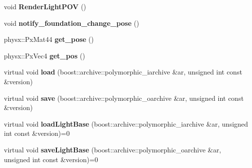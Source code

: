 \begin{DoxyCompactItemize}
\item 
\hypertarget{classNeb_1_1Light_1_1Base_aac6c4177c6fd3b4f8773b0d431203ccc}{void {\bfseries \-Render\-Light\-P\-O\-V} ()}\label{classNeb_1_1Light_1_1Base_aac6c4177c6fd3b4f8773b0d431203ccc}

\item 
\hypertarget{classNeb_1_1Light_1_1Base_a45e032e7aa7203c0832d52949e14141c}{void {\bfseries notify\-\_\-foundation\-\_\-change\-\_\-pose} ()}\label{classNeb_1_1Light_1_1Base_a45e032e7aa7203c0832d52949e14141c}

\item 
\hypertarget{classNeb_1_1Light_1_1Base_a78c4664de9ddf719dea72d00fa8498a4}{physx\-::\-Px\-Mat44 {\bfseries get\-\_\-pose} ()}\label{classNeb_1_1Light_1_1Base_a78c4664de9ddf719dea72d00fa8498a4}

\item 
\hypertarget{classNeb_1_1Light_1_1Base_a125c8d3d4795bcec4ec546d82686bf38}{physx\-::\-Px\-Vec4 {\bfseries get\-\_\-pos} ()}\label{classNeb_1_1Light_1_1Base_a125c8d3d4795bcec4ec546d82686bf38}

\item 
\hypertarget{classNeb_1_1Light_1_1Base_ac8b71e530696633d24137c4d5d695af5}{virtual void {\bfseries load} (boost\-::archive\-::polymorphic\-\_\-iarchive \&ar, unsigned int const \&version)}\label{classNeb_1_1Light_1_1Base_ac8b71e530696633d24137c4d5d695af5}

\item 
\hypertarget{classNeb_1_1Light_1_1Base_a4e83a340a8c97d92da3bf3165bc4b176}{virtual void {\bfseries save} (boost\-::archive\-::polymorphic\-\_\-oarchive \&ar, unsigned int const \&version)}\label{classNeb_1_1Light_1_1Base_a4e83a340a8c97d92da3bf3165bc4b176}

\item 
\hypertarget{classNeb_1_1Light_1_1Base_a54780bbb4d3ce64a6151c20b1f72f6ef}{virtual void {\bfseries load\-Light\-Base} (boost\-::archive\-::polymorphic\-\_\-iarchive \&ar, unsigned int const \&version)=0}\label{classNeb_1_1Light_1_1Base_a54780bbb4d3ce64a6151c20b1f72f6ef}

\item 
\hypertarget{classNeb_1_1Light_1_1Base_a83fd19d93bf401dd11f9fd30eb9ba7dc}{virtual void {\bfseries save\-Light\-Base} (boost\-::archive\-::polymorphic\-\_\-oarchive \&ar, unsigned int const \&version)=0}\label{classNeb_1_1Light_1_1Base_a83fd19d93bf401dd11f9fd30eb9ba7dc}

\end{DoxyCompactItemize}
